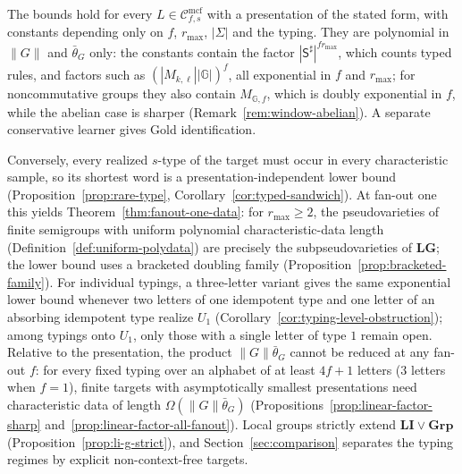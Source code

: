 \documentclass[11pt]{article}
\numberwithin{equation}{section}
\theoremstyle{plain}
\theoremstyle{definition}
\theoremstyle{remark}
\newcommand{\Cmcf}[2]{\mathcal{C}^{\mathrm{mcf}}_{#1,#2}}
\begin{document}
\noindent
The bounds hold for every $L\in\Cmcf{f}{s}$ with a presentation of the
stated form, with constants depending only on $f$, $r_{\max}$, $|\Sigma|$ and
the typing.  They are polynomial in $\|G\|$ and $\bar\theta_G$ only: the
constants contain the factor
$|\mathsf S^\sharp|^{fr_{\max}}$, which counts typed rules, and factors such as
$(|M_{k,\ell}||\mathbb G|)^f$, all exponential in $f$ and $r_{\max}$; for
noncommutative groups they also contain $M_{\mathbb G,f}$, which is doubly
exponential in $f$, while the abelian case is sharper
(Remark~\ref{rem:window-abelian}).  A separate conservative
learner gives Gold identification.

Conversely, every realized $s$-type of the target must occur in every
characteristic sample, so its shortest word is a presentation-independent
lower bound (Proposition~\ref{prop:rare-type},
Corollary~\ref{cor:typed-sandwich}).  At fan-out one this yields
Theorem~\ref{thm:fanout-one-data}: for $r_{\max}\ge2$, the pseudovarieties of
finite semigroups with uniform polynomial characteristic-data length
(Definition~\ref{def:uniform-polydata}) are precisely the subpseudovarieties
of $\mathbf{LG}$; the lower bound uses a bracketed doubling family
(Proposition~\ref{prop:bracketed-family}).  For individual typings, a
three-letter variant gives the same exponential lower bound whenever two letters
of one idempotent type and one letter of an absorbing idempotent type realize
$U_1$ (Corollary~\ref{cor:typing-level-obstruction}); among typings onto $U_1$,
only those with a single letter of type $1$ remain open.  Relative to the presentation,
the product $\|G\|\bar\theta_G$ cannot be reduced at any fan-out $f$: for every
fixed typing over an alphabet of at least $4f+1$ letters ($3$ letters when
$f=1$), finite targets with asymptotically smallest presentations
need characteristic data of length $\Omega(\|G\|\bar\theta_G)$
(Propositions~\ref{prop:linear-factor-sharp}
and~\ref{prop:linear-factor-all-fanout}).  Local groups strictly extend
$\mathbf{LI}\vee\mathbf{Grp}$ (Proposition~\ref{prop:li-g-strict}), and
Section~\ref{sec:comparison} separates the typing regimes by explicit
non-context-free targets.
\end{document}
